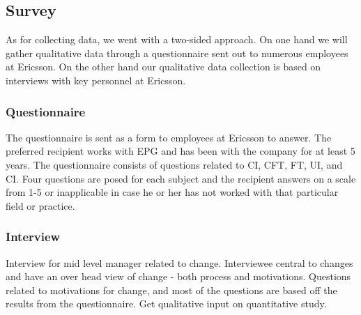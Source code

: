 \documentclass[final_report_innit.tex]{subfiles}
\begin{document}
\subsection{Survey}
As for collecting data, we went with a two-sided approach. On one hand we will gather qualitative data through a questionnaire sent out to numerous employees at Ericsson. On the other hand our qualitative data collection is based on interviews with key personnel at Ericsson.

\subsubsection{Questionnaire}
The questionnaire is sent as a form to employees at Ericsson to answer. The preferred recipient works with EPG and has been with the company for at least 5 years. The questionnaire consists of questions related to CI, CFT, FT, UI, and CI. Four questions are posed for each subject and the recipient answers on a scale from 1-5 or inapplicable in case he or her has not worked with that particular field or practice.

\subsubsection{Interview}
Interview for mid level manager related to change. Interviewee central to changes and have an over head view of change - both process and motivations.
Questions related to motivations for change, and most of the questions are based off the results from the questionnaire. Get qualitative input on quantitative study.
\end{document}

